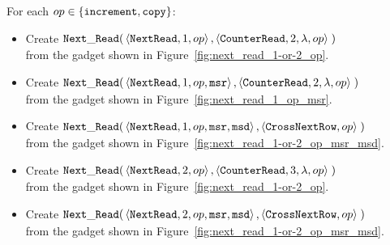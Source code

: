 For each $op\in \{ {\tt increment}, {\tt copy} \}$:
\begin{itemize}

    \item Create
    $\begin{aligned}[t]
        {\tt Next\_Read}(& \left\langle {\tt NextRead},    1,          op \right\rangle,
                    \left\langle {\tt CounterRead}, 2, \lambda, op \right\rangle \;)
    \end{aligned}$\\from the gadget shown in Figure~\ref{fig:next_read_1-or-2_op}.

    \item Create
    $\begin{aligned}[t]
        {\tt Next\_Read}(& \left\langle {\tt NextRead},    1,          op, {\tt msr} \right\rangle,
                    \left\langle {\tt CounterRead}, 2, \lambda, op            \right\rangle \;)
    \end{aligned}$\\from the gadget shown in Figure~\ref{fig:next_read_1_op_msr}.

    \item Create
    $\begin{aligned}[t]
        {\tt Next\_Read}(& \left\langle {\tt NextRead}, 1,  op, {\tt msr}, {\tt msd} \right\rangle,
                    \left\langle {\tt CrossNextRow}, op                       \right\rangle \;)
    \end{aligned}$\\from the gadget shown in Figure~\ref{fig:next_read_1-or-2_op_msr_msd}.


    \item Create
    $\begin{aligned}[t]
        {\tt Next\_Read}(& \left\langle {\tt NextRead},    2,          op \right\rangle,
                    \left\langle {\tt CounterRead}, 3, \lambda, op \right\rangle \;)
    \end{aligned}$\\from the gadget shown in Figure~\ref{fig:next_read_1-or-2_op}.

    \item Create
    $\begin{aligned}[t]
        {\tt Next\_Read}(& \left\langle {\tt NextRead}, 2,  op, {\tt msr}, {\tt msd} \right\rangle,
                    \left\langle {\tt CrossNextRow}, op                       \right\rangle \;)
    \end{aligned}$\\from the gadget shown in Figure~\ref{fig:next_read_1-or-2_op_msr_msd}.



\end{itemize}
